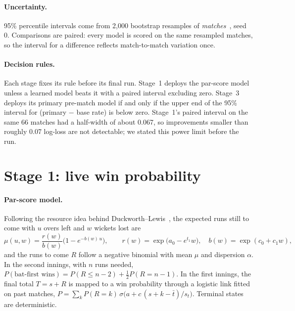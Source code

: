\documentclass[11pt]{article}
\begin{document}
\paragraph{Uncertainty.} 95\% percentile intervals come from 2{,}000 bootstrap resamples of
\emph{matches}~\citep{efrontibshirani1993}, seed 0. Comparisons are paired: every model is scored on the
same resampled matches, so the interval for a difference reflects match-to-match variation once.

\paragraph{Decision rules.} Each stage fixes its rule before its final run. Stage~1 deploys the par-score
model unless a learned model beats it with a paired interval excluding zero. Stage~3 deploys its
primary pre-match model if and only if the upper end of the 95\% interval for
(primary $-$ base rate) is below zero. Stage~1's paired interval on the same 66 matches had a
half-width of about 0.067, so improvements smaller than roughly 0.07 log-loss are not detectable; we
stated this power limit before the run.

\section{Stage 1: live win probability}\label{sec:live}

\paragraph{Par-score model.} Following the resource idea behind Duckworth--Lewis~\citep{duckworth1998,stern2016},
the expected runs still to come with $u$ overs left and $w$ wickets lost are
\begin{equation}
  \mu(u,w) = \frac{r(w)}{b(w)}\bigl(1-e^{-b(w)\,u}\bigr),\qquad
  r(w)=\exp\!\bigl(a_0-e^{t_1}w\bigr),\quad b(w)=\exp(c_0+c_1 w),
\end{equation}
and the runs to come $R$ follow a negative binomial with mean $\mu$ and dispersion $\alpha$. In the second
innings, with $n$ runs needed, $P(\text{bat-first wins}) = P(R\le n-2)+\tfrac12 P(R=n-1)$. In the first
innings, the final total $T=s+R$ is mapped to a win probability through a logistic link fitted on past
matches, $P=\sum_k P(R=k)\,\sigma\!\bigl(a+c\,(s+k-\bar t)/s_t\bigr)$. Terminal states are deterministic.
\end{document}
